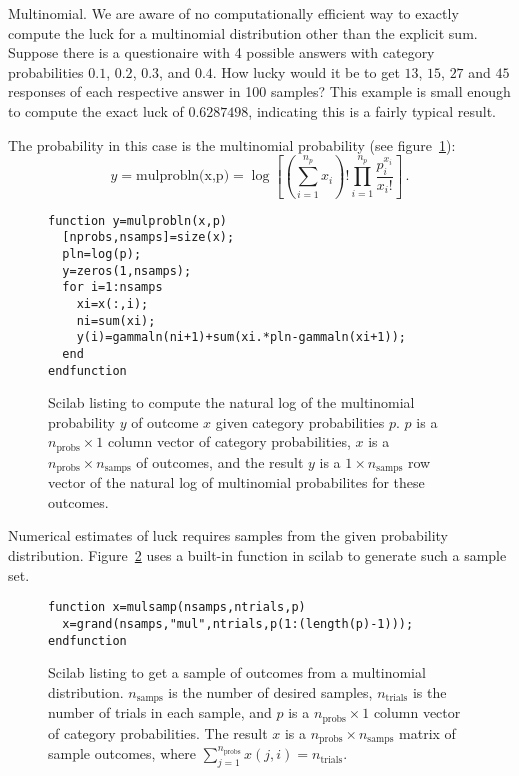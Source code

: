 \begin{example}{Multinomial.} We are aware of no computationally efficient way to exactly compute the luck for a multinomial distribution other than the explicit sum.  Suppose there is a questionaire with 4 possible answers with category probabilities $0.1$, $0.2$, $0.3$, and $0.4$.  How lucky would it be to get $13$, $15$, $27$ and $45$ responses of each respective answer in 100 samples?  This example is small enough to compute the exact luck of $0.6287498$,  indicating this is a fairly typical result.

The probability in this case is the multinomial probability (see figure~\ref{fig:mulprobln}):
\begin{equation}
y=\text{mulprobln(x,p)}=\log \left[\left(\sum_{i=1}^{n_p} x_i \right)! \prod_{i=1}^{n_p} \frac{p_i^{x_i}}{x_i!} \right]\,.
\end{equation}

\begin{figure}
\caption{\label{fig:mulprobln}Scilab listing to compute the natural log of the multinomial probability $y$ of outcome $x$ given category probabilities $p$.  $p$ is a $n_{\text{probs}} \times 1$ column vector of category probabilities, $x$ is a $n_{\text{probs}} \times n_{\text{samps}}$ of outcomes, and the result $y$ is a $1 \times n_{\text{samps}}$ row vector of the natural log of multinomial probabilites for these outcomes.}
\lstset{language=Scilab}
\begin{lstlisting}
function y=mulprobln(x,p)
  [nprobs,nsamps]=size(x);
  pln=log(p);
  y=zeros(1,nsamps);
  for i=1:nsamps
    xi=x(:,i);
    ni=sum(xi);
    y(i)=gammaln(ni+1)+sum(xi.*pln-gammaln(xi+1));
  end
endfunction
\end{lstlisting}
\end{figure}

Numerical estimates of luck requires samples from the given probability distribution.  Figure~\ref{fig:mulsamps} uses a built-in function in scilab to generate such a sample set.
\begin{figure}
\caption{\label{fig:mulsamps}Scilab listing to get a sample of outcomes from a multinomial distribution.  $n_{\text{samps}}$ is the number of desired samples, $n_{\text{trials}}$ is the number of trials in each sample, and $p$ is a $n_{\text{probs}} \times 1$ column vector of category probabilities.  The result $x$ is a $n_{\text{probs}} \times n_{\text{samps}}$ matrix of sample outcomes, where $\sum_{j=1}^{n_{\text{probs}}} x(j,i)=n_{\text{trials}}$.}
\lstset{language=Scilab}
\begin{lstlisting}
function x=mulsamp(nsamps,ntrials,p)
  x=grand(nsamps,"mul",ntrials,p(1:(length(p)-1)));
endfunction
\end{lstlisting}
\end{figure}


\end{example}
